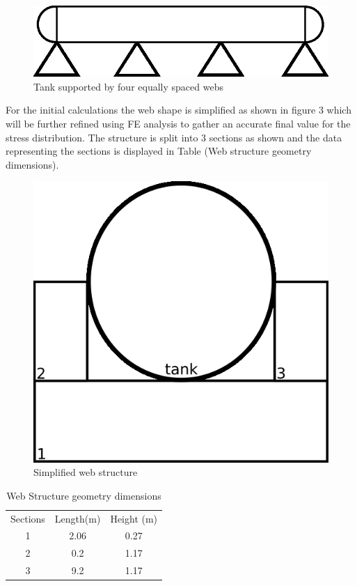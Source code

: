 \begin{figure}[!htbp]
\centering
\includegraphics[width= 0.8\linewidth]{../figures/tank_equal_webs.jpg}
\caption{Tank supported by four equally spaced webs}
  \label{fig:tank_equal_webs}
\end{figure}
\FloatBarrier

For the initial calculations the web shape is simplified as shown in figure 3 which will be further refined using FE analysis to gather an accurate final value for the stress distribution. The structure is split into 3 sections as shown and the data representing the sections is displayed in Table (Web structure geometry dimensions).


\begin{figure}[!htbp]
\centering
\includegraphics[width= 0.8\linewidth]{../figures/simplified_web_structure.jpg}
\caption{Simplified web structure}
  \label{fig:tank_equal_webs}
\end{figure}
\FloatBarrier

\begin{table}[h!]
  \centering
  \begin{tabular}{|c|c|c|}
    \hline
    Sections & Length(m) & Height (m) \\
    1 & 2.06 & 0.27 \\
    \hline
    2 & 0.2 & 1.17 \\
    \hline
    3 & 9.2 & 1.17 \\
    \hline
  \end{tabular}
  \caption{Web Structure geometry dimensions}
  \label{tab:web_structure_geometry_dimensions}
\end{table}

